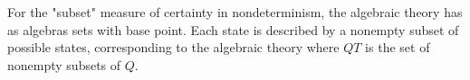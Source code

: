 For the "subset" measure of certainty in nondeterminism, the algebraic theory has as algebras sets with base point. Each state is described by a nonempty subset of possible states, corresponding to the algebraic theory where $QT$ is the set of nonempty subsets of $Q$.
